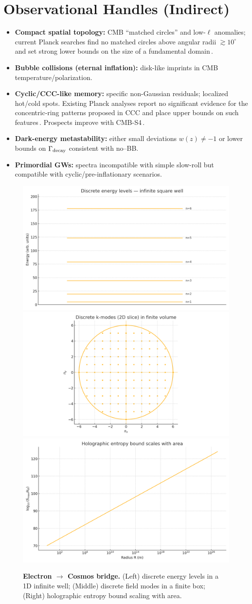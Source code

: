 \documentclass[12pt]{article}
\theoremstyle{remark}
\begin{document}
\section{Observational Handles (Indirect)}
\begin{itemize}[leftmargin=1.2em]
  \item \textbf{Compact spatial topology:} CMB ``matched circles'' and low-$\ell$ anomalies; current Planck searches find no matched circles above angular radii $\gtrsim 10^{\circ}$ and set strong lower bounds on the size of a fundamental domain\,\cite{CornishSpergelStarkman1998,Planck2016Topology}.
  \item \textbf{Bubble collisions (eternal inflation):} disk-like imprints in CMB temperature/polarization.
  \item \textbf{Cyclic/CCC-like memory:} specific non-Gaussian residuals; localized hot/cold spots. Existing Planck analyses report no significant evidence for the concentric-ring patterns proposed in CCC and place upper bounds on such features\,\cite{WehusEriksen2011,Planck2015Isotropy}. Prospects improve with CMB-S4\,\cite{CMBS4SB}.
  \item \textbf{Dark-energy metastability:} either small deviations $w(z)\neq -1$ or lower bounds on $\Gamma_{\rm decay}$ consistent with no--BB.
  \item \textbf{Primordial GWs:} spectra incompatible with simple slow-roll but compatible with cyclic/pre-inflationary scenarios.
\end{itemize}


\begin{figure}[h]
  \centering
\includegraphics[width=0.32\linewidth]{fig_energy_levels}
\includegraphics[width=0.32\linewidth]{fig_k_modes}
\includegraphics[width=0.32\linewidth]{fig_holographic_bound}
  \caption{\textbf{Electron $\to$ Cosmos bridge.} (Left) discrete energy levels in a 1D infinite well; (Middle) discrete field modes in a finite box; (Right) holographic entropy bound scaling with area.}
\end{figure}
\end{document}
